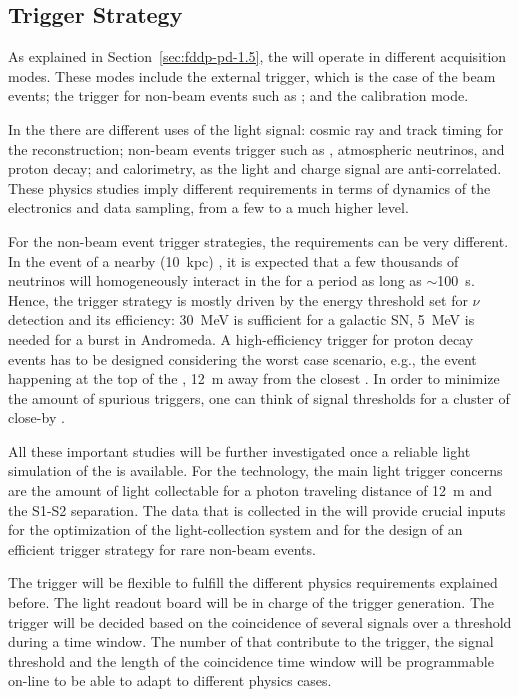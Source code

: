 \subsection{Trigger Strategy}
\label{sec:fddp-pd-7.2}

As explained in Section~\ref{sec:fddp-pd-1.5}, the  will operate in different acquisition modes. These modes include the external trigger, which is the case of the beam events; the trigger for non-beam events such as  ; and the calibration mode. 

In the \lartpc there are different uses of the light signal: cosmic ray and track timing for the reconstruction; non-beam events trigger such as , atmospheric neutrinos, and proton decay; and calorimetry, as the light and charge signal are anti-correlated. These physics studies imply different requirements in terms of dynamics of the electronics and data sampling, from a few \phel to a much higher level.

For the non-beam event trigger strategies, the requirements can be very different. In the event of a nearby (\SI{10}{kpc})  , it is expected that a few thousands of neutrinos will homogeneously interact in the  for a period as long as $\sim$\SI{100}{s}. Hence, the   trigger strategy is mostly driven by the energy threshold set for $\nu$ detection and its efficiency: \SI{30}{MeV} is sufficient for a galactic SN, \SI{5}{MeV} is needed for a burst in Andromeda. A high-efficiency trigger for proton decay events has to be designed considering the worst case scenario, e.g., the event happening at the top of the , \SI{12}{m} away from the closest . In order to minimize the amount of spurious triggers, one can think of signal thresholds for a cluster of close-by .

All these important studies will be further investigated once a reliable light simulation of the  is available. For the \dual  technology, the main light trigger concerns are the amount of light collectable for a photon traveling distance of \SI{12}{m} and the S1-S2 separation. The data that is collected in the  will provide crucial inputs for the optimization of the  light-collection system and for the design of an efficient trigger strategy for rare non-beam events. 

The  trigger will be flexible to fulfill the different physics requirements explained before. 
The light readout  board will be in charge of the  trigger generation. The trigger will be decided based on the coincidence of several  signals over a threshold during a time window. The number of  that contribute to the trigger, the signal threshold and the length of the coincidence time window will be programmable on-line to be able to adapt to different physics cases.


